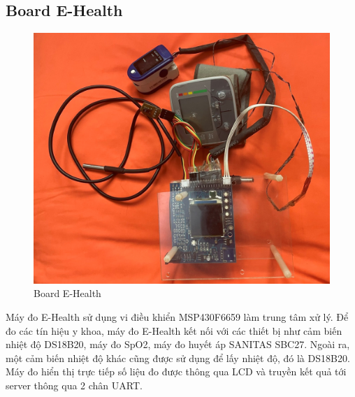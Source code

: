 \documentclass{report}
\begin{document}
\subsection{Board E-Health}
\begin{figure}[h]
	\centering
	\includegraphics[scale = 0.4]{fig40.png}
	\caption{Board E-Health}
	\label{fig:Graph40}
\end{figure}

Máy đo E-Health sử dụng vi điều khiển MSP430F6659 làm trung tâm xử lý. Để đo các
tín hiệu y khoa, máy đo E-Health kết nối với các thiết bị như cảm biến nhiệt độ DS18B20, máy đo SpO2, máy đo huyết áp SANITAS SBC27. Ngoài ra, một cảm biến nhiệt độ khác cũng được sử dụng để lấy nhiệt độ, đó là DS18B20. \\

Máy đo hiển thị trực tiếp số liệu đo được thông qua LCD và truyền kết quả tới server thông qua 2 chân UART. \\
\end{document}
